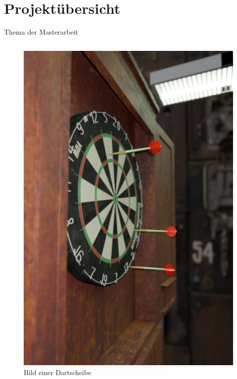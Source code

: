 
\section{Projektübersicht}

\begin{frame}{Thema der Masterarbeit}
    \begin{columns}
        \begin{column}{0.4\linewidth}

            \begin{figure}
                \centering
                \includegraphics[height=0.7\textheight]{imgs/dartboard.png}
                \caption{Bild einer Dartscheibe}
            \end{figure}


\end{column}
\end{columns}
\end{frame}
